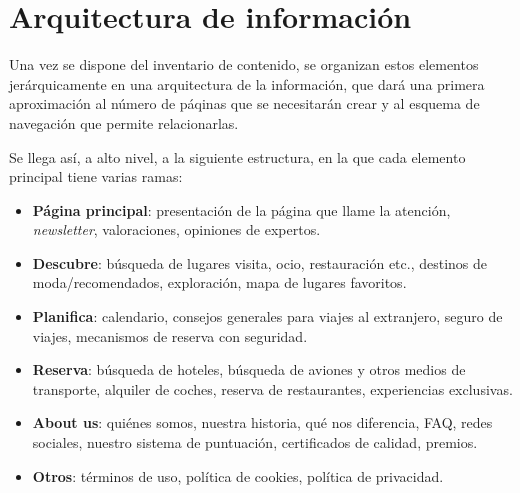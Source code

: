 \documentclass[11pt, a4paper]{book}
\begin{document}
	\section{Arquitectura de información}
	Una vez se dispone del inventario de contenido, se organizan estos elementos jerárquicamente en una arquitectura de la información, que dará una primera aproximación al número de páqinas que se necesitarán crear y al esquema de navegación que permite relacionarlas. 
	
	Se llega así, a alto nivel, a la siguiente estructura, en la que cada elemento principal tiene varias ramas:
	
	\begin{itemize}
		\item \textbf{Página principal}: presentación de la página que llame la atención, \textit{newsletter}, valoraciones, opiniones de expertos.
		\item \textbf{Descubre}: búsqueda de lugares visita, ocio, restauración etc., destinos de moda/recomendados, exploración, mapa de lugares favoritos.
		\item \textbf{Planifica}: calendario, consejos generales para viajes al extranjero, seguro de viajes, mecanismos de reserva con seguridad.
		\item \textbf{Reserva}: búsqueda de hoteles, búsqueda de aviones y otros medios de transporte, alquiler de coches, reserva de restaurantes, experiencias exclusivas.
		\item \textbf{About us}: quiénes somos, nuestra historia, qué nos diferencia, FAQ, redes sociales, nuestro sistema de puntuación, certificados de calidad, premios.
		\item \textbf{Otros}: términos de uso, política de cookies, política de privacidad.
	\end{itemize}
\end{document}
